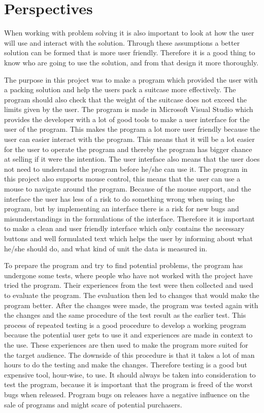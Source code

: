 \section{Perspectives}
When working with problem solving it is also important to look at how the user will use and interact with the solution. Through these assumptions a better solution can be formed that is more user friendly. Therefore it is a good thing to know who are going to use the solution, and from that design it more thoroughly.

The purpose in this project was to make a program which provided the user with a packing solution and help the users pack a suitcase more effectively. The program should also check that the weight of the suitcase does not exceed the limits given by the user. The program is made in Microsoft Visual Studio which provides the developer with a lot of good tools to make a user interface for the user of the program.
This makes the program a lot more user friendly because the user can easier interact with the program. This means that it will be a lot easier for the user to operate the program and thereby the program has bigger chance at selling if it were the intention.
The user interface also means that the user does not need to understand the program before he/she can use it.
The program in this project also supports mouse control, this means that the user can use a mouse to navigate around the program. Because of the mouse support, and the interface the user has less of a risk to do something wrong when using the program, but by implementing an interface there is a risk for new bugs and misunderstandings in the formulations of the interface.
Therefore it is important to make a clean and user friendly interface which only contains the necessary buttons and well formulated text which helps the user by informing about what he/she should do, and what kind of unit the data is measured in.

To prepare the program and try to find potential problems, the program has undergone some tests, where people who have not worked with the project have tried the program. Their experiences from the test were then collected and used to evaluate the program. The evaluation then led to changes that would make the program better. After the changes were made, the program was tested again with the changes and the same procedure of the test result as the earlier test.
This process of repeated testing is a good procedure to develop a working program because the potential user gets to use it and experiences are made in context to the use. These experiences are then used to make the program more suited for the target audience. The downside of this procedure is that it takes a lot of man hours to do the testing and make the changes. Therefore testing is a good but expensive tool, hour-wise, to use.
It should always be taken into consideration to test the program, because it is important that the program is freed of the worst bugs when released. Program bugs on releases have a negative influence on the sale of programs and might scare of potential purchasers.


